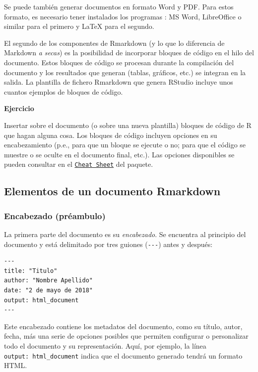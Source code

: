 \documentclass[
]{article}
\newcounter{ejcnt}[section]
\numberwithin{ejcnt}{section}
\newenvironment{ej}[1][]{%
	\refstepcounter{ejcnt}%
	\par\medskip%
	\noindent%
	\textbf{Ejercicio \theejcnt \;\;}%
	\rmfamily%
}{\medskip}
\begin{document}
Se puede también generar documentos en formato Word y PDF. Para estos formato, es necesario tener instalados los programas : MS Word, LibreOffice o similar para el primero y LaTeX para el segundo.

El segundo de los componentes de Rmarkdown (y lo que lo diferencia de Markdown \emph{a secas}) es la posibilidad de incorporar bloques de código en el hilo del documento. Estos bloques de código se procesan durante la compilación del documento y los resultados que generan (tablas, gráficos, etc.) se integran en la salida. La plantilla de fichero Rmarkdown que genera RStudio incluye unos cuantos ejemplos de bloques de código.

\begin{ej}
Insertar sobre el documento (o sobre una nueva plantilla) bloques de
código de R que hagan alguna cosa. Los bloques de código incluyen
opciones en su encabezamiento (p.e., para que un bloque se ejecute o no;
para que el código se muestre o se oculte en el documento final, etc.).
Las opciones disponibles se pueden consultar en el
\href{https://www.rstudio.com/wp-content/uploads/2015/02/rmarkdown-cheatsheet.pdf}{\texttt{Cheat\ Sheet}}
del paquete.
\end{ej}

\hypertarget{elementos-de-un-documento-rmarkdown}{%
\subsection{Elementos de un documento Rmarkdown}\label{elementos-de-un-documento-rmarkdown}}

\hypertarget{encabezado-pruxe9ambulo}{%
\subsubsection{Encabezado (préambulo)}\label{encabezado-pruxe9ambulo}}

La primera parte del documento es su \emph{encabezado}. Se encuentra al principio del documento y está delimitado por tres guiones (\texttt{-\/-\/-}) antes y después:

\begin{verbatim}
---
title: "Titulo"
author: "Nombre Apellido"
date: "2 de mayo de 2018"
output: html_document
---
\end{verbatim}

Este encabezado contiene los metadatos del documento, como su título, autor, fecha, más una serie de opciones posibles que permiten configurar o personalizar todo el documento y su representación. Aquí, por ejemplo, la línea \texttt{output:\ html\_document} indica que el documento generado tendrá un formato HTML.
\end{document}
